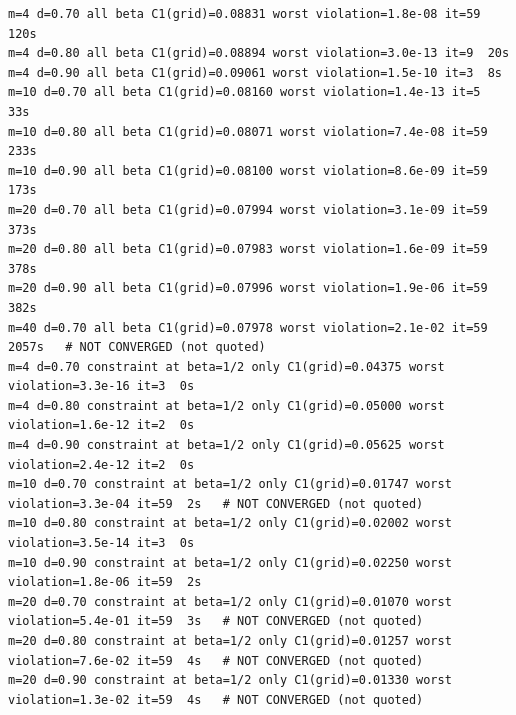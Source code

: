 \documentclass[11pt,reqno]{amsart}
\numberwithin{equation}{section}
\theoremstyle{definition}
\theoremstyle{remark}
\begin{document}
\begin{lstlisting}
m=4 d=0.70 all beta C1(grid)=0.08831 worst violation=1.8e-08 it=59  120s
m=4 d=0.80 all beta C1(grid)=0.08894 worst violation=3.0e-13 it=9  20s
m=4 d=0.90 all beta C1(grid)=0.09061 worst violation=1.5e-10 it=3  8s
m=10 d=0.70 all beta C1(grid)=0.08160 worst violation=1.4e-13 it=5  33s
m=10 d=0.80 all beta C1(grid)=0.08071 worst violation=7.4e-08 it=59  233s
m=10 d=0.90 all beta C1(grid)=0.08100 worst violation=8.6e-09 it=59  173s
m=20 d=0.70 all beta C1(grid)=0.07994 worst violation=3.1e-09 it=59  373s
m=20 d=0.80 all beta C1(grid)=0.07983 worst violation=1.6e-09 it=59  378s
m=20 d=0.90 all beta C1(grid)=0.07996 worst violation=1.9e-06 it=59  382s
m=40 d=0.70 all beta C1(grid)=0.07978 worst violation=2.1e-02 it=59  2057s   # NOT CONVERGED (not quoted)
m=4 d=0.70 constraint at beta=1/2 only C1(grid)=0.04375 worst violation=3.3e-16 it=3  0s
m=4 d=0.80 constraint at beta=1/2 only C1(grid)=0.05000 worst violation=1.6e-12 it=2  0s
m=4 d=0.90 constraint at beta=1/2 only C1(grid)=0.05625 worst violation=2.4e-12 it=2  0s
m=10 d=0.70 constraint at beta=1/2 only C1(grid)=0.01747 worst violation=3.3e-04 it=59  2s   # NOT CONVERGED (not quoted)
m=10 d=0.80 constraint at beta=1/2 only C1(grid)=0.02002 worst violation=3.5e-14 it=3  0s
m=10 d=0.90 constraint at beta=1/2 only C1(grid)=0.02250 worst violation=1.8e-06 it=59  2s
m=20 d=0.70 constraint at beta=1/2 only C1(grid)=0.01070 worst violation=5.4e-01 it=59  3s   # NOT CONVERGED (not quoted)
m=20 d=0.80 constraint at beta=1/2 only C1(grid)=0.01257 worst violation=7.6e-02 it=59  4s   # NOT CONVERGED (not quoted)
m=20 d=0.90 constraint at beta=1/2 only C1(grid)=0.01330 worst violation=1.3e-02 it=59  4s   # NOT CONVERGED (not quoted)
\end{lstlisting}
\clearpage
\end{document}
